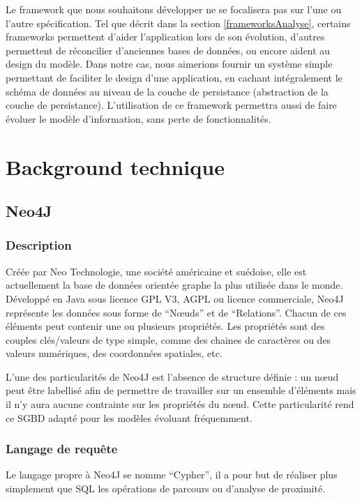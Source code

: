 \documentclass[a4paper,fleqn,12pt,oneside]{report}
\begin{document}
\label{positionnement}
Le framework que nous souhaitons développer ne se focalisera pas sur l'une ou l'autre spécification. Tel que décrit dans la section \ref{frameworksAnalyse}, certains frameworks permettent d'aider l'application lors de son évolution, d'autres permettent de réconcilier d'anciennes bases de données, ou encore aident au design du modèle. Dans notre cas, nous aimerions fournir un système simple permettant de faciliter le design d'une application, en cachant intégralement le schéma de données au niveau de la couche de persistance (abstraction de la couche de persistance). L'utilisation de ce framework permettra aussi de faire évoluer le modèle d'information, sans perte de fonctionnalités.


\chapter{Background technique}
\section{Neo4J}

\subsection{Description}

Créée par Neo Technologie, une société américaine et suédoise, elle est actuellement la base de données orientée graphe  la plus utilisée dans le monde\cite{DBEnginesSite}. Développé en Java sous licence GPL V3, AGPL ou licence commerciale, Neo4J représente les données sous forme de \enquote{Nœuds} et de \enquote{Relations}. Chacun de ces éléments peut contenir une ou plusieurs propriétés. Les propriétés sont des couples clés/valeurs de type simple, comme des chaines de caractères ou des valeurs numériques, des coordonnées spatiales, etc\cite{Neo4JSite}.

L'une des particularités de Neo4J est l'absence de structure définie : un nœud peut être labellisé afin de permettre de travailler sur un ensemble d'éléments mais il n'y aura aucune contrainte sur les propriétés du nœud. Cette particularité rend ce SGBD adapté pour les modèles évoluant fréquemment.


\subsection{Langage de requête}

Le langage propre à Neo4J se nomme \enquote{Cypher}\label{Cypher}, il a pour but de réaliser plus simplement que SQL les opérations de parcours ou d'analyse de proximité.
\end{document}
